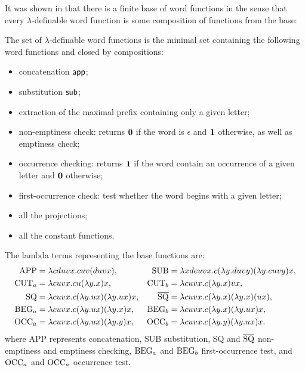 It was shown in \cite{DBLP:journals/tcs/Zaionc87} that there is a
finite base of word functions in the sense that every
$\lambda$-definable word function is some composition of functions
from the base:
\begin{theorem}
The set of $\lambda$-definable word functions is the minimal set containing the following word functions and closed by compositions:
\begin{itemize}
  \item concatenation ${\sf app}$;
  \item substitution ${\sf sub}$;
  \item extraction of the maximal prefix containing only a given letter;
  \item non-emptiness check:  returns $\mathbf{0}$ if the word is $\epsilon$ and $\mathbf{1}$ otherwise, as well as emptiness check;
  \item occurrence checking: returns $\mathbf{1}$ if the word contain an occurrence of a given letter and $\mathbf{0}$ otherwise;
  \item first-occurrence check:  test whether the word begins with a given letter;
  \item all the projections;
  \item all the constant functions.
\end{itemize}
\end{theorem}
The lambda terms representing the base functions are:
\begin{align*}
  {\rm APP} &= \lambda c d u v x.c u v(d u v x), & {\rm SUB} &= \lambda x d e u v x.c(\lambda y.d u v y)(\lambda y . e u v y) x, \\
  {\rm CUT}_a &= \lambda c u v x . c u (\lambda y.x) x, & {\rm CUT}_b &= \lambda c u v x . c (\lambda y.x) v x, \\
  {\rm SQ} &= \lambda c u v x . c (\lambda y.u x) (\lambda y.u x) x, & \overline{{\rm SQ}} &= \lambda c u v x . c (\lambda y.x) (\lambda y.x) (u x), \\
  {\rm BEG}_a &= \lambda c u v x . c (\lambda y.u x) (\lambda y.x) x, & {\rm BEG}_b &= \lambda c u v x . c (\lambda y.x) (\lambda y.u x) x, \\
  {\rm OCC}_a &= \lambda c u v x . c (\lambda y.u x) (\lambda y.y) x, & {\rm OCC}_b &= \lambda c u v x . c (\lambda y.y) (\lambda y.u x) x.
\end{align*}
where {\rm APP} represents concatenation, {\rm SUB} substitution,
{\rm SQ} and $\overline{{\rm SQ}}$ non-emptiness and emptiness checking, ${\rm BEG}_a$ and
${\rm BEG}_b$ first-occurrence test, and ${\rm OCC}_a$ and ${\rm OCC}_a$ occurrence test.

